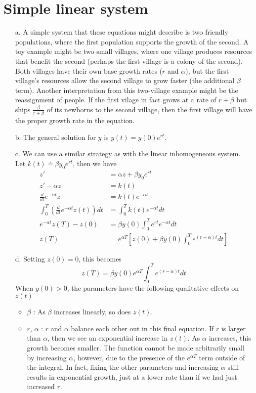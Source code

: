 \documentclass{article}
\begin{document}
\section{Simple linear system}
\begin{enumerate}
	\item[a.]
		A simple system that these equations might describe is two friendly populations, where the first population supports the growth of the second. A toy example might be two small villages, where one village produces resources that benefit the second (perhaps the first village is a colony of the second). Both villages have their own base growth rates ($r$ and $\alpha$), but the first village's resources allow the second village to grow faster (the additional $\beta$ term). Another interpretation from this two-village example might be the reassignment of people. If the first vilage in fact grows at a rate of $r + \beta$ but ships $\frac{\beta}{r + \beta}$ of its newborns to the second village, then the first village will have the proper growth rate in the equation.
	
	\item[b.]
		The general solution for $y$ is $y(t) = y(0) e^{rt}$.

	\item[c.]
		We can use a similar strategy as with the linear inhomogeneous system. Let $k(t) \doteq \beta y_0 e^{rt}$, then we have
		\begin{align*}
			z' &= \alpha z + \beta y_0 e^{rt} \\
			z' - \alpha z &= k(t) \\
			\frac{d }{d t} e^{-\alpha t} z &= k(t) e^{-\alpha t} \\
			\int_{0}^{T} \left( \frac{d }{d t} e^{-\alpha t} z(t) \right) dt &= \int_{0}^{T} k(t) e^{-\alpha t} dt \\
			e^{-\alpha t} z(T) - z(0) &= \beta y(0) \int_{0}^{T} e^{rt} e^{-\alpha t} dt \\
			z(T) &= e^{\alpha T} \left[ z(0) + \beta y(0) \int_{0}^{T} e^{(r-\alpha) t} dt \right]
		\end{align*}

	\item[d.]
		Setting $z(0) = 0$, this becomes
		\[
		z(T) = \beta y(0) e^{\alpha T} \int_{0}^{T} e^{(r-\alpha) t} dt
		\] 
		When $y(0) > 0$, the parameters have the following qualitative effects on $z(t) $ 
		\begin{itemize}
			\item $\beta$ : As $\beta$ increases linearly, so does $z(t)$.
			\item $r$, $\alpha$ : $r$ and $\alpha$ balance each other out in this final equation. If $r$ is larger than $\alpha$, then we see an exponential increase in $z(t)$. As $\alpha$ increases, this growth becomes smaller. The function cannot be made arbitrarily small by increasing $\alpha$, however, due to the presence of the $e^{\alpha T}$ term outside of the integral. In fact, fixing the other parameters and increasing $\alpha$ still results in exponential growth, just at a lower rate than if we had just increased $r$.
		\end{itemize}
\end{enumerate}
\end{document}
